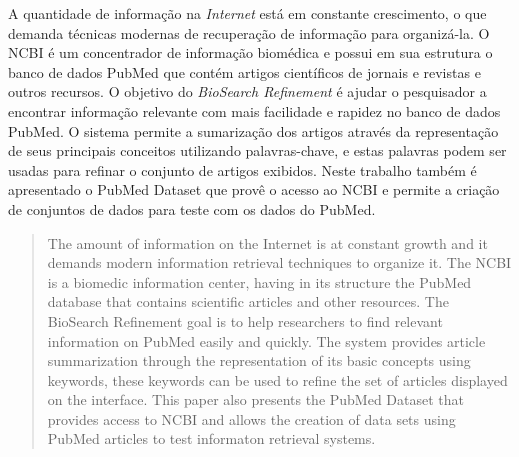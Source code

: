 \begin{resumo}
A quantidade de informação na \emph{Internet} está em constante crescimento, o que demanda técnicas modernas de recuperação de informação para organizá-la. O NCBI é um concentrador de informação biomédica e possui em sua estrutura o banco de dados PubMed que contém artigos científicos de jornais e revistas e outros recursos. O objetivo do \emph{BioSearch Refinement} é ajudar o pesquisador a encontrar informação relevante com mais facilidade e rapidez no banco de dados PubMed. O sistema permite a sumarização dos artigos através da representação de seus principais conceitos utilizando palavras-chave, e estas palavras podem ser usadas para refinar o conjunto de artigos exibidos. Neste trabalho também é apresentado o PubMed Dataset que provê o acesso ao NCBI e permite a criação de conjuntos de dados para teste com os dados do PubMed.
\end{resumo}

\begin{abstract}
The amount of information on the Internet is at constant growth and it demands modern information retrieval techniques to organize it. The NCBI is a biomedic information center, having in its structure the PubMed database that contains scientific articles and other resources. The BioSearch Refinement goal is to help researchers to find relevant information on PubMed easily and quickly. The system provides article summarization through the representation of its basic concepts using keywords, these keywords can be used to refine the set of articles displayed on the interface. This paper also presents the PubMed Dataset that provides access to NCBI and allows the creation of data sets using PubMed articles to test informaton retrieval systems.
\end{abstract}

